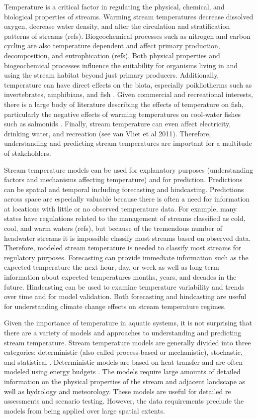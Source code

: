 \documentclass[]{article}
\begin{document}
Temperature is a critical factor in regulating the physical, chemical,
and biological properties of streams. Warming stream temperatures
decrease dissolved oxygen, decrease water density, and alter the
circulation and stratification patterns of streams (refs).
Biogeochemical processes such as nitrogen and carbon cycling are also
temperature dependent and affect primary production, decomposition, and
eutrophication (refs). Both physical properties and biogeochemical
processes influence the suitability for organisms living in and using
the stream habitat beyond just primary producers. Additionally,
temperature can have direct effects on the biota, especially
poikliotherms such as invertebrates, amphibians, and fish
\citep[e.g.,][]{Kanno2013, Xu2010, Xu2010a, Al-Chokhachy2013a}. Given
commercial and recreational interests, there is a large body of
literature describing the effects of temperature on fish, particularly
the negative effects of warming temperatures on cool-water fishes such
as salmonids . Finally, stream temperature can even affect electricity,
drinking water, and recreation (see van Vliet et al 2011). Therefore,
understanding and predicting stream temperatures are important for a
multitude of stakeholders.

Stream temperature models can be used for explanatory purposes
(understanding factors and mechanisms affecting temperature) and for
prediction. Predictions can be spatial and temporal including
forecasting and hindcasting. Predictions across space are especially
valuable because there is often a need for information at locations with
little or no observed temperature data. For example, many states have
regulations related to the management of streams classified as cold,
cool, and warm waters (refs), but because of the tremendous number of
headwater streams it is impossible classify most streams based on
observed data. Therefore, modeled stream temperature is needed to
classify most streams for regulatory purposes. Forecasting can provide
immediate information such as the expected temperature the next hour,
day, or week as well as long-term information about expected
temperatures months, years, and decades in the future. Hindcasting can
be used to examine temperature variability and trends over time and for
model validation. Both forecasting and hindcasting are useful for
understanding climate change effects on stream temperature regimes.

Given the importance of temperature in aquatic systems, it is not
surprising that there are a variety of models and approaches to
understanding and predicting stream temperature. Stream temperature
models are generally divided into three categories: deterministic (also
called process-based or mechanistic), stochastic, and statistical
\citep{Chang2013, Caissie2006, Benyahya2007}. Deterministic models are
based on heat transfer and are often modeled using energy budgets
\citep{Benyahya2007, Caissie2006}. The models require large amounts of
detailed information on the physical properties of the stream and
adjacent landscape as well as hydrology and meteorology. These models
are useful for detailed re assessments and scenario testing. However,
the data requirements preclude the models from being applied over large
spatial extents.
\end{document}
